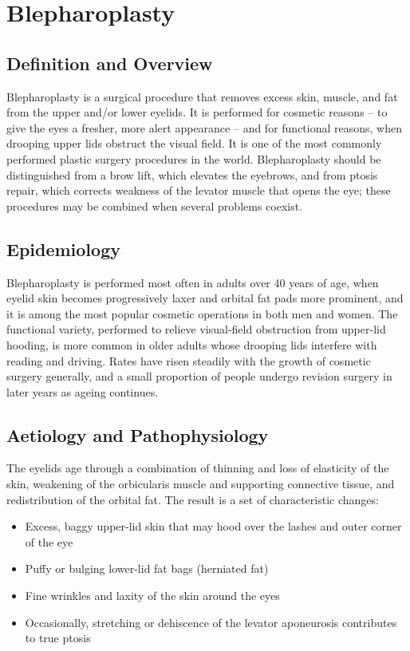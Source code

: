 \chapter{Blepharoplasty}

\section*{Definition and Overview}
Blepharoplasty is a surgical procedure that removes excess skin, muscle, and fat from the upper and/or lower eyelids. It is performed for cosmetic reasons -- to give the eyes a fresher, more alert appearance -- and for functional reasons, when drooping upper lids obstruct the visual field. It is one of the most commonly performed plastic surgery procedures in the world. Blepharoplasty should be distinguished from a brow lift, which elevates the eyebrows, and from ptosis repair, which corrects weakness of the levator muscle that opens the eye; these procedures may be combined when several problems coexist.

\section*{Epidemiology}
Blepharoplasty is performed most often in adults over 40 years of age, when eyelid skin becomes progressively laxer and orbital fat pads more prominent, and it is among the most popular cosmetic operations in both men and women. The functional variety, performed to relieve visual-field obstruction from upper-lid hooding, is more common in older adults whose drooping lids interfere with reading and driving. Rates have risen steadily with the growth of cosmetic surgery generally, and a small proportion of people undergo revision surgery in later years as ageing continues.

\section*{Aetiology and Pathophysiology}
The eyelids age through a combination of thinning and loss of elasticity of the skin, weakening of the orbicularis muscle and supporting connective tissue, and redistribution of the orbital fat. The result is a set of characteristic changes:

\begin{itemize}
    \item Excess, baggy upper-lid skin that may hood over the lashes and outer corner of the eye
    \item Puffy or bulging lower-lid fat bags (herniated fat)
    \item Fine wrinkles and laxity of the skin around the eyes
    \item Occasionally, stretching or dehiscence of the levator aponeurosis contributes to true ptosis
\end{itemize}

